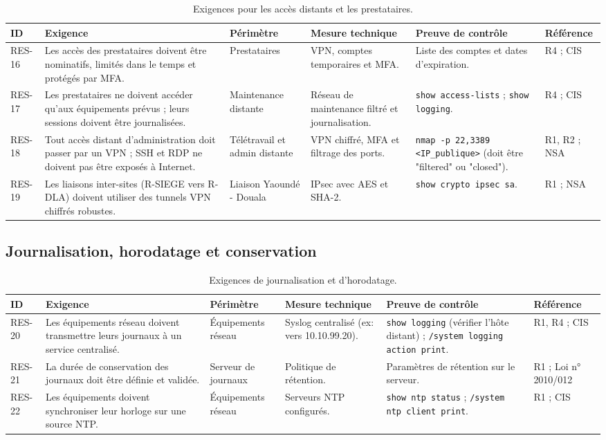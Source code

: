 \documentclass[11pt,a4paper]{article}
\begin{document}
	\scriptsize
	\begin{longtable}{p{0.7cm} p{3.95cm} p{1.95cm} p{3.2cm} p{3.0cm} p{1.8cm}}
		\caption{Exigences pour les accès distants et les prestataires.}\\
		\hline
		\textbf{ID} & \textbf{Exigence} & \textbf{Périmètre} & \textbf{Mesure technique} & \textbf{Preuve de contrôle} & \textbf{Référence}\\
		\hline
		\endhead
		RES-16 & Les accès des prestataires doivent être nominatifs, limités dans le temps et protégés par MFA. & Prestataires & VPN, comptes temporaires et MFA. & Liste des comptes et dates d'expiration. & R4 ; CIS\\
		\hline
		RES-17 & Les prestataires ne doivent accéder qu'aux équipements prévus ; leurs sessions doivent être journalisées. & Maintenance distante & Réseau de maintenance filtré et journalisation. & \texttt{show access-lists} ; \texttt{show logging}. & R4 ; CIS\\
		\hline
		RES-18 & Tout accès distant d'administration doit passer par un VPN ; SSH et RDP ne doivent pas être exposés à Internet. & Télétravail et admin distante & VPN chiffré, MFA et filtrage des ports. & \texttt{nmap -p 22,3389 <IP\_publique>} (doit être "filtered" ou "closed"). & R1, R2 ; NSA\\
		\hline
		RES-19 & Les liaisons inter-sites (R-SIEGE vers R-DLA) doivent utiliser des tunnels VPN chiffrés robustes. & Liaison Yaoundé - Douala & IPsec avec AES et SHA-2. & \texttt{show crypto ipsec sa}. & R1 ; NSA\\
		\hline
	\end{longtable}
	\normalsize
	
	\subsection{Journalisation, horodatage et conservation}
	
	\scriptsize
	\begin{longtable}{p{0.7cm} p{3.95cm} p{1.95cm} p{3.2cm} p{3.0cm} p{1.8cm}}
		\caption{Exigences de journalisation et d'horodatage.}\\
		\hline
		\textbf{ID} & \textbf{Exigence} & \textbf{Périmètre} & \textbf{Mesure technique} & \textbf{Preuve de contrôle} & \textbf{Référence}\\
		\hline
		\endhead
		RES-20 & Les équipements réseau doivent transmettre leurs journaux à un service centralisé. & Équipements réseau & Syslog centralisé (ex: vers 10.10.99.20). & \texttt{show logging} (vérifier l'hôte distant) ; \texttt{/system logging action print}. & R1, R4 ; CIS\\
		\hline
		RES-21 & La durée de conservation des journaux doit être définie et validée. & Serveur de journaux & Politique de rétention. & Paramètres de rétention sur le serveur. & R1 ; Loi n° 2010/012\\
		\hline
		RES-22 & Les équipements doivent synchroniser leur horloge sur une source NTP. & Équipements réseau & Serveurs NTP configurés. & \texttt{show ntp status} ; \texttt{/system ntp client print}. & R1 ; CIS\\
		\hline
	\end{longtable}
	\normalsize
	
\end{document}
